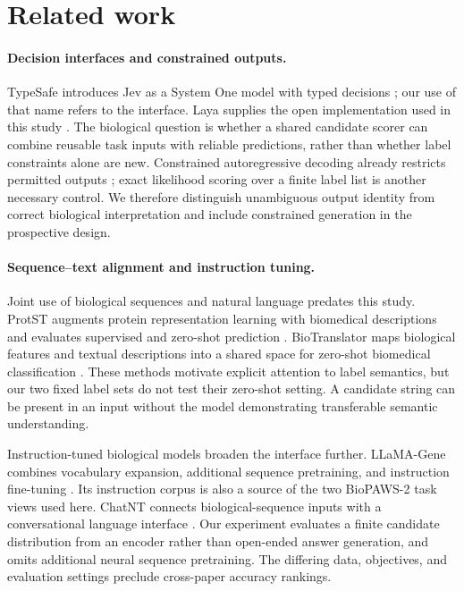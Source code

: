 \section{Related work}

\paragraph{Decision interfaces and constrained outputs.}
TypeSafe introduces Jev as a System One model with typed decisions \citep{almeida2026jev}; our use of that name refers to the interface. Laya supplies the open implementation used in this study \citep{laya2026}. The biological question is whether a shared candidate scorer can combine reusable task inputs with reliable predictions, rather than whether label constraints alone are new. Constrained autoregressive decoding already restricts permitted outputs \citep{scholak2021picard}; exact likelihood scoring over a finite label list is another necessary control. We therefore distinguish unambiguous output identity from correct biological interpretation and include constrained generation in the prospective design.

\paragraph{Sequence--text alignment and instruction tuning.}
Joint use of biological sequences and natural language predates this study. ProtST augments protein representation learning with biomedical descriptions and evaluates supervised and zero-shot prediction \citep{xu2023protst}. BioTranslator maps biological features and textual descriptions into a shared space for zero-shot biomedical classification \citep{xu2023biotranslator}. These methods motivate explicit attention to label semantics, but our two fixed label sets do not test their zero-shot setting. A candidate string can be present in an input without the model demonstrating transferable semantic understanding.

Instruction-tuned biological models broaden the interface further. LLaMA-Gene combines vocabulary expansion, additional sequence pretraining, and instruction fine-tuning \citep{wang2024llamagene}. Its instruction corpus is also a source of the two BioPAWS-2 task views used here. ChatNT connects biological-sequence inputs with a conversational language interface \citep{almeida2025chatnt}. Our experiment evaluates a finite candidate distribution from an encoder rather than open-ended answer generation, and omits additional neural sequence pretraining. The differing data, objectives, and evaluation settings preclude cross-paper accuracy rankings.

